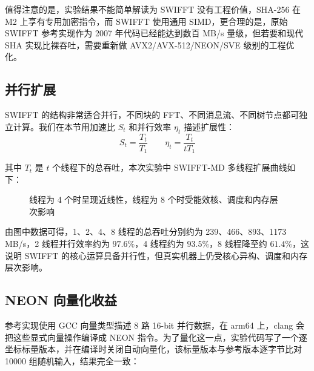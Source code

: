 \documentclass{article}
\begin{document}
值得注意的是，实验结果不能简单解读为 SWIFFT 没有工程价值，SHA-256 在 M2 上享有专用加密指令，而 SWIFFT 使用通用 SIMD，更合理的是，原始 SWIFFT 参考实现作为 2007 年代码已经能达到数百 MB/s 量级，但若要和现代 SHA 实现比裸吞吐，需要重新做 AVX2/AVX-512/NEON/SVE 级别的工程优化。



\subsection{并行扩展}
SWIFFT 的结构非常适合并行，不同块的 FFT、不同消息流、不同树节点都可独立计算。我们在本节用加速比 $S_t$ 和并行效率 $\eta_t$ 描述扩展性：
\[ S_t=\dfrac{T_t}{T_1}\qquad\eta_t=\frac{T_t}{tT_1} \]

其中 $T_t$ 是 $t$ 个线程下的总吞吐，本次实验中 SWIFFT-MD 多线程扩展曲线如下：

\begin{figure}[H]
    \centering
    \caption{线程为 4 个时呈现近线性，线程为 8 个时受能效核、调度和内存层次影响}
\end{figure}

由图中数据可得，1、2、4、8 线程的总吞吐分别约为 239、466、893、1173 MB/s，2 线程并行效率约为 $97.6\%$，4 线程约为 $93.5\%$，8 线程降至约 $61.4\%$，这说明 SWIFFT 的核心运算具备并行性，但真实机器上仍受核心异构、调度和内存层次影响。



\subsection{NEON 向量化收益}
参考实现使用 GCC 向量类型描述 8 路 16-bit 并行数据，在 arm64 上，clang 会把这些显式向量操作编译成 NEON 指令。为了量化这一点，实验代码写了一个逐坐标标量版本，并在编译时关闭自动向量化，该标量版本与参考版本逐字节比对 10000 组随机输入，结果完全一致：
\end{document}

